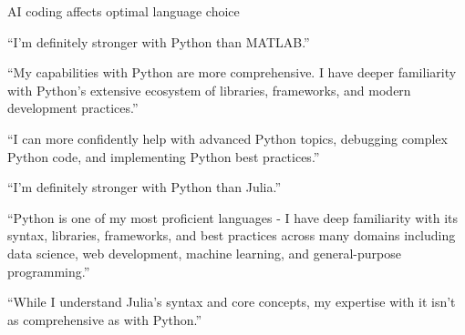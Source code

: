 \begin{frame}{AI coding affects optimal language choice}



    \medskip
    \medskip
    
    ``I'm definitely stronger with Python than MATLAB.''

    \vspace{0.5em}
    ``My capabilities with Python
    are more comprehensive. I have deeper familiarity with Python's extensive
    ecosystem of libraries, frameworks, and modern development practices.''


    \vspace{0.5em}
    ``I can
    more confidently help with advanced Python topics, debugging complex Python
    code, and implementing Python best practices.''

\end{frame}

\begin{frame}
    
    ``I'm definitely stronger with Python than Julia.''

    \vspace{0.5em}
    \vspace{0.5em}
    ``Python is one of my most proficient languages - I have deep familiarity with
    its syntax, libraries, frameworks, and best practices across many domains
    including data science, web development, machine learning, and
    general-purpose programming.''

    \vspace{0.5em}
    \vspace{0.5em}
    ``While I understand Julia's syntax and core concepts, my expertise with it
    isn't as comprehensive as with Python.''

\end{frame}

